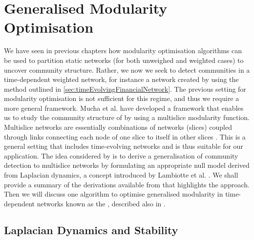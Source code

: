
\section{Generalised Modularity Optimisation}
\label{sec:generalisedModularityOptimisation}

We have seen in previous chapters how modularity optimisation algorithms can be used to partition static networks (for both unweighed and weighted cases) to uncover community structure.
Rather, we now we seek to detect communities in a time-dependent weighted network, for instance a network created by using the method outlined in \cref{sec:timeEvolvingFinancialNetwork}.
The previous setting for modularity optimisation is not sufficient for this regime, and thus we require a more general framework.
Mucha et al. \cite{MRM+10} have developed a framework that enables us to study the community structure of  by using a multislice modularity function.
Multislice networks are essentially combinations of networks (slices) coupled through links connecting each node of one slice to itself in other slices \cite{MRM+10}.
This is a general setting that includes time-evolving networks and is thus suitable for our application.
The idea considered by \cite{MRM+10} is to derive a generalisation of community detection to multislice networks by formulating an appropriate null model derived from Laplacian dynamics, a concept introduced by Lambiotte et al. \cite{LDB08}.
We shall provide a summary of the derivations available from \cite{LDB08,Lam10,MRM+10} that highlights the approach.
Then we will discuss one algorithm to optimise generalised modularity in time-dependent networks known as the , described also in \cite{MRM+10,BPW+13}.


\subsection{Laplacian Dynamics and Stability}
\label{subsec:laplacianDynamicsAndStability}

